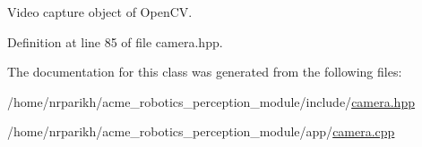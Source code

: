 Video capture object of Open\+CV. 



Definition at line 85 of file camera.\+hpp.



The documentation for this class was generated from the following files\+:\begin{DoxyCompactItemize}
\item 
/home/nrparikh/acme\+\_\+robotics\+\_\+perception\+\_\+module/include/\hyperlink{camera_8hpp}{camera.\+hpp}\item 
/home/nrparikh/acme\+\_\+robotics\+\_\+perception\+\_\+module/app/\hyperlink{camera_8cpp}{camera.\+cpp}\end{DoxyCompactItemize}
